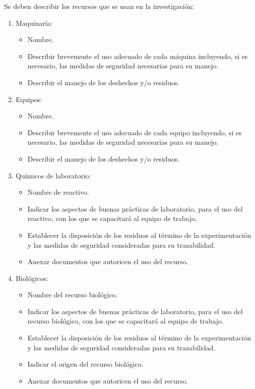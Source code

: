 Se deben describir los recursos que se usan en la investigación:

\begin{enumerate}
	\item Maquinaría:
	\begin{itemize}
		\item Nombre.
		\item Describir brevemente el uso adecuado de cada máquina incluyendo, si es necesario, las medidas de seguridad necesarias para su manejo.
		\item Describir el manejo de los deshechos y/o residuos.
	\end{itemize}

	\item Equipos:
	\begin{itemize}
		\item Nombre.
		\item Describir brevemente el uso adecuado de cada equipo incluyendo, si es necesario, las medidas de seguridad necesarias para su manejo.
		\item Describir el manejo de los deshechos y/o residuos.
	\end{itemize}

	\item Químicos de laboratorio:
	\begin{itemize}
		\item Nombre de reactivo.
		\item Indicar los aspectos de buenas prácticas de laboratorio, para el uso del reactivo, con los que se capacitará al equipo de trabajo.
		\item Establecer la disposición de los residuos al término de la experimentación y las medidas de seguridad consideradas para su trazabilidad.
		\item Anexar documentos que autoricen el uso del recurso.
	\end{itemize}
	
	\item Biológicos:
	\begin{itemize}
		\item Nombre del recurso biológico.
		\item Indicar los aspectos de buenas prácticas de laboratorio, para el uso del recurso biológico, con los que se capacitará al equipo de trabajo.
		\item Establecer la disposición de los residuos al término de la experimentación y las medidas de seguridad consideradas para su trazabilidad.
		\item Indicar el origen del recurso biológico. 
		\item Anexar documentos que autoricen el uso del recurso.
	\end{itemize}
	

\end{enumerate}
